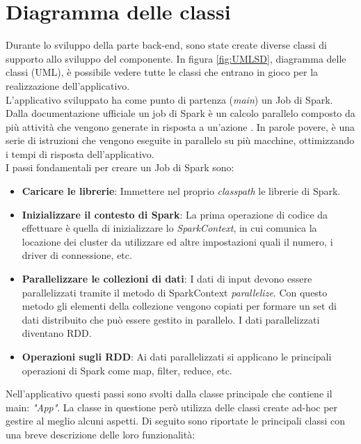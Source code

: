 \section{Diagramma delle classi}
\label{sec:diagramma delle classi}
Durante lo sviluppo della parte back-end, sono state create diverse classi di supporto allo sviluppo del componente. In figura \ref{fig:UMLSD}, diagramma delle classi (UML), è possibile vedere tutte le classi che entrano in gioco per la realizzazione dell'applicativo.
\\L'applicativo sviluppato ha come punto di partenza (\textit{main}) un Job di Spark. Dalla documentazione ufficiale un job di Spark è un calcolo parallelo composto da più attività che vengono generate in risposta a un'azione \cite{spark:job}. In parole povere, è una serie di istruzioni che vengono eseguite in parallelo su più macchine, ottimizzando i tempi di risposta dell'applicativo. 
\\I passi fondamentali per creare un Job di Spark sono:
\begin{itemize}
\item \textbf{Caricare le librerie}: Immettere nel proprio \textit{classpath} le librerie di Spark.
\item \textbf{Inizializzare il contesto di Spark}: La prima operazione di codice da effettuare è quella di inizializzare lo \textit{SparkContext}, in cui comunica la locazione dei cluster da utilizzare ed altre impostazioni quali il numero, i driver di connessione, etc.
\item \textbf{Parallelizzare le collezioni di dati}: I dati di input devono essere parallelizzati tramite il metodo di SparkContext \textit{parallelize}.
Con questo metodo gli elementi della collezione vengono copiati per formare un set di dati distribuito che può essere gestito in parallelo. I dati parallelizzati diventano RDD.
\item \textbf{Operazioni sugli RDD}: Ai dati parallelizzati si applicano le principali operazioni di Spark come map, filter, reduce, etc.
\end{itemize}
Nell'applicativo questi passi sono svolti dalla classe principale che contiene il main: \textit{"App"}. La classe in questione però utilizza delle classi create ad-hoc per gestire al meglio alcuni aspetti. Di seguito sono riportate le principali classi con una breve descrizione delle loro funzionalità: 
